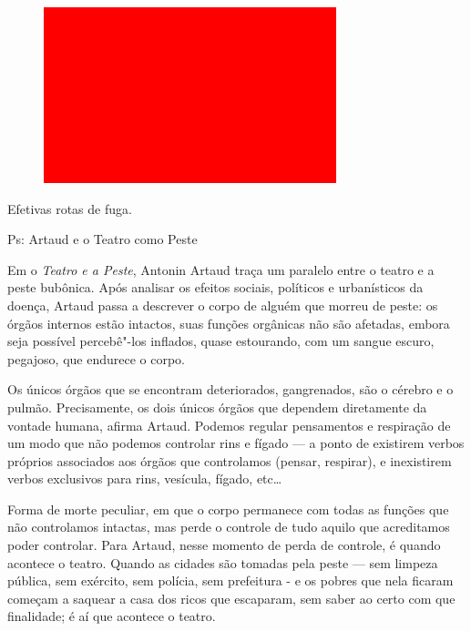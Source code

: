 \begin{figure}[!ht]
\centering
 \includegraphics[width=85mm]{./imgs/im1.jpg}
\caption{\footnotesize{}}
\end{figure}

Efetivas rotas de fuga.

\asterisc

Ps: Artaud e o Teatro como Peste

Em o \emph{Teatro e a Peste}, Antonin Artaud traça um paralelo entre o
teatro e a peste bubônica. Após analisar os efeitos sociais, políticos e
urbanísticos da doença, Artaud passa a descrever o corpo de alguém que
morreu de peste: os órgãos internos estão intactos, suas funções
orgânicas não são afetadas, embora seja possível percebê"-los inflados,
quase estourando, com um sangue escuro, pegajoso, que endurece o corpo.

Os únicos órgãos que se encontram deteriorados, gangrenados, são o
cérebro e o pulmão. Precisamente, os dois únicos órgãos que dependem
diretamente da vontade humana, afirma Artaud. Podemos regular
pensamentos e respiração de um modo que não podemos controlar rins e
fígado --- a ponto de existirem verbos próprios associados aos órgãos que
controlamos (pensar, respirar), e inexistirem verbos exclusivos para
rins, vesícula, fígado, etc\ldots{}

Forma de morte peculiar, em que o corpo permanece com todas as funções
que não controlamos intactas, mas perde o controle de tudo aquilo que
acreditamos poder controlar. Para Artaud, nesse momento de perda de
controle, é quando acontece o teatro. Quando as cidades são tomadas pela
peste --- sem limpeza pública, sem exército, sem polícia, sem prefeitura -
e os pobres que nela ficaram começam a saquear a casa dos ricos que
escaparam, sem saber ao certo com que finalidade; é aí que acontece o
teatro.

